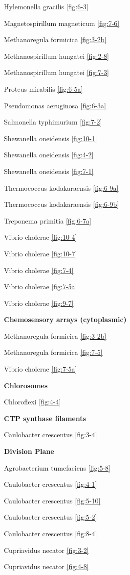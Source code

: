 \documentclass[]{tufte-book}
\begin{document}
Hylemonella gracilis \ref{fig:6-3}

Magnetospirillum magneticum \ref{fig:7-6}

Methanoregula formicica \ref{fig:3-2b}

Methanospirillum hungatei \ref{fig:2-8}

Methanospirillum hungatei \ref{fig:7-3}

Proteus mirabilis \ref{fig:6-5a}

Pseudomonas aeruginosa \ref{fig:6-3a}

Salmonella typhimurium \ref{fig:7-2}

Shewanella oneidensis \ref{fig:10-1}

Shewanella oneidensis \ref{fig:4-2}

Shewanella oneidensis \ref{fig:7-1}

Thermococcus kodakaraensis \ref{fig:6-9a}

Thermococcus kodakaraensis \ref{fig:6-9b}

Treponema primitia \ref{fig:6-7a}

Vibrio cholerae \ref{fig:10-4}

Vibrio cholerae \ref{fig:10-7}

Vibrio cholerae \ref{fig:7-4}

Vibrio cholerae \ref{fig:7-5a}

Vibrio cholerae \ref{fig:9-7}

\textbf{Chemosensory arrays (cytoplasmic)}

Methanoregula formicica \ref{fig:3-2b}

Methanoregula formicica \ref{fig:7-5}

Vibrio cholerae \ref{fig:7-5a}

\textbf{Chlorosomes}

Chloroflexi \ref{fig:4-4}

\textbf{CTP synthase filaments}

Caulobacter crescentus \ref{fig:3-4}

\textbf{Division Plane}

Agrobacterium tumefaciens \ref{fig:5-8}

Caulobacter crescentus \ref{fig:4-1}

Caulobacter crescentus \ref{fig:5-10}

Caulobacter crescentus \ref{fig:5-2}

Caulobacter crescentus \ref{fig:8-4}

Cupriavidus necator \ref{fig:3-2}

Cupriavidus necator \ref{fig:4-8}
\end{document}
